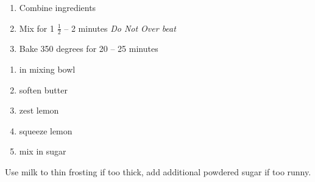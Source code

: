 \documentclass[letter]{recipe}
\begin{document}

\begin{enumerate}
\addtolength{\itemindent}{2em}
 \item Combine ingredients
%
 \item Mix for 1 $\frac{1}{2}$ -- 2 minutes \emph{Do Not Over beat}
%
 \item Bake 350 degrees for 20 -- 25 minutes
%
\end{enumerate}

\begin{enumerate}
\addtolength{\itemindent}{2em}
\item in mixing bowl
\item soften butter
\item zest lemon
\item squeeze lemon
\item mix in sugar
\end{enumerate}
Use milk to thin frosting if too thick, add additional powdered sugar
if too runny.
\end{document}
